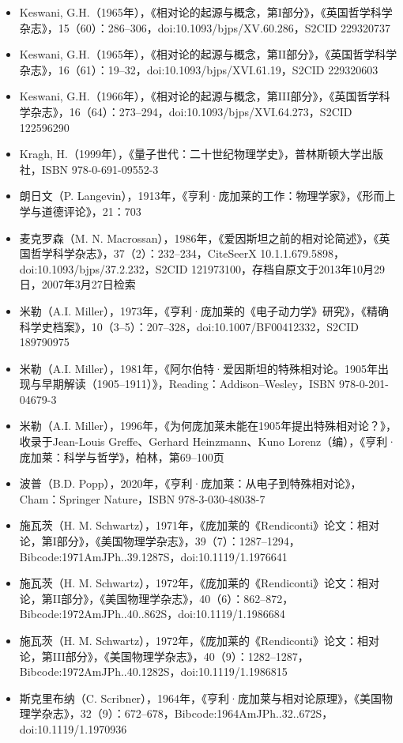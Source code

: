 \begin{itemize}
\item Keswani, G.H.（1965年），《相对论的起源与概念，第I部分》，《英国哲学科学杂志》，15（60）：286–306，doi:10.1093/bjps/XV.60.286，S2CID 229320737  
\item Keswani, G.H.（1965年），《相对论的起源与概念，第II部分》，《英国哲学科学杂志》，16（61）：19–32，doi:10.1093/bjps/XVI.61.19，S2CID 229320603  
\item Keswani, G.H.（1966年），《相对论的起源与概念，第III部分》，《英国哲学科学杂志》，16（64）：273–294，doi:10.1093/bjps/XVI.64.273，S2CID 122596290  
\item Kragh, H.（1999年），《量子世代：二十世纪物理学史》，普林斯顿大学出版社，ISBN 978-0-691-09552-3  
\item 朗日文（P. Langevin），1913年，《亨利·庞加莱的工作：物理学家》，《形而上学与道德评论》，21：703  
\item 麦克罗森（M. N. Macrossan），1986年，《爱因斯坦之前的相对论简述》，《英国哲学科学杂志》，37（2）：232–234，CiteSeerX 10.1.1.679.5898，doi:10.1093/bjps/37.2.232，S2CID 121973100，存档自原文于2013年10月29日，2007年3月27日检索  
\item 米勒（A.I. Miller），1973年，《亨利·庞加莱的《电子动力学》研究》，《精确科学史档案》，10（3–5）：207–328，doi:10.1007/BF00412332，S2CID 189790975  
\item 米勒（A.I. Miller），1981年，《阿尔伯特·爱因斯坦的特殊相对论。1905年出现与早期解读（1905–1911）》，Reading：Addison–Wesley，ISBN 978-0-201-04679-3  
\item 米勒（A.I. Miller），1996年，《为何庞加莱未能在1905年提出特殊相对论？》，收录于Jean-Louis Greffe、Gerhard Heinzmann、Kuno Lorenz（编），《亨利·庞加莱：科学与哲学》，柏林，第69–100页  
\item 波普（B.D. Popp），2020年，《亨利·庞加莱：从电子到特殊相对论》，Cham：Springer Nature，ISBN 978-3-030-48038-7  
\item 施瓦茨（H. M. Schwartz），1971年，《庞加莱的《Rendiconti》论文：相对论，第I部分》，《美国物理学杂志》，39（7）：1287–1294，Bibcode:1971AmJPh..39.1287S，doi:10.1119/1.1976641  
\item 施瓦茨（H. M. Schwartz），1972年，《庞加莱的《Rendiconti》论文：相对论，第II部分》，《美国物理学杂志》，40（6）：862–872，Bibcode:1972AmJPh..40..862S，doi:10.1119/1.1986684  
\item 施瓦茨（H. M. Schwartz），1972年，《庞加莱的《Rendiconti》论文：相对论，第III部分》，《美国物理学杂志》，40（9）：1282–1287，Bibcode:1972AmJPh..40.1282S，doi:10.1119/1.1986815  
\item 斯克里布纳（C. Scribner），1964年，《亨利·庞加莱与相对论原理》，《美国物理学杂志》，32（9）：672–678，Bibcode:1964AmJPh..32..672S，doi:10.1119/1.1970936  

\end{itemize}
